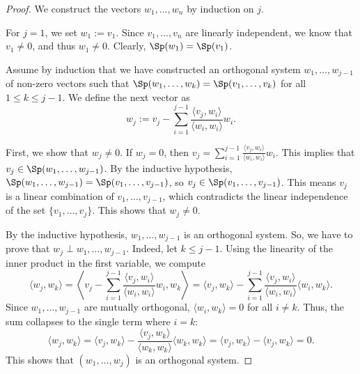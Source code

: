 \begin{proof}
    We construct the vectors $w_1, \dots, w_n$ by induction on $j$.
    
    For $j=1$, we set $w_1 := v_1$. Since $v_1, \dots, v_n$ are linearly independent, we know that $v_1 \neq 0$, and thus $w_1 \neq 0$. Clearly, $\Sp(w_1) = \Sp(v_1)$.
    
    Assume by induction that we have constructed an orthogonal system $w_1, \dots, w_{j-1}$ of non-zero vectors such that $\Sp(w_1, \dots, w_k) = \Sp(v_1, \dots, v_k)$ for all $1 \leq k \leq j-1$. We define the next vector as
    \begin{equation*}
        w_j := v_j - \sum_{i=1}^{j-1} \frac{\langle v_j, w_i \rangle}{\langle w_i, w_i \rangle} w_i.
    \end{equation*}
    
    First, we show that $w_j \neq 0$. If $w_j = 0$, then $v_j = \sum_{i=1}^{j-1} \frac{\langle v_j, w_i \rangle}{\langle w_i, w_i \rangle} w_i$. This implies that $v_j \in \Sp(w_1, \dots, w_{j-1})$. By the inductive hypothesis, $\Sp(w_1, \dots, w_{j-1}) = \Sp(v_1, \dots, v_{j-1})$, so $v_j \in \Sp(v_1, \dots, v_{j-1})$. This means $v_j$ is a linear combination of $v_1, \dots, v_{j-1}$, which contradicts the linear independence of the set $\{v_1, \dots, v_j\}$. This shows that $w_j \neq 0$.
    
    By the inductive hypothesis, $w_1, \dots, w_{j-1}$ is an orthogonal system. So, we have to prove that $w_j \perp w_1, \dots, w_{j-1}$. Indeed, let $k \leq j-1$. Using the linearity of the inner product in the first variable, we compute
    \begin{equation*}
        \langle w_j, w_k \rangle = \left\langle v_j - \sum_{i=1}^{j-1} \frac{\langle v_j, w_i \rangle}{\langle w_i, w_i \rangle} w_i, w_k \right\rangle = \langle v_j, w_k \rangle - \sum_{i=1}^{j-1} \frac{\langle v_j, w_i \rangle}{\langle w_i, w_i \rangle} \langle w_i, w_k \rangle.
    \end{equation*}
    Since $w_1, \dots, w_{j-1}$ are mutually orthogonal, $\langle w_i, w_k \rangle = 0$ for all $i \neq k$. Thus, the sum collapses to the single term where $i=k$:
    \begin{equation*}
        \langle w_j, w_k \rangle = \langle v_j, w_k \rangle - \frac{\langle v_j, w_k \rangle}{\langle w_k, w_k \rangle} \langle w_k, w_k \rangle = \langle v_j, w_k \rangle - \langle v_j, w_k \rangle = 0.
    \end{equation*}
    This shows that $(w_1, \dots, w_j)$ is an orthogonal system.
    

\end{proof}
